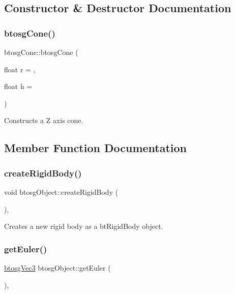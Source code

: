 \subsection{Constructor \& Destructor Documentation}
\mbox{\label{classbtosgCone_a119bf79e2311ba084939d3e25086751c}} 
\subsubsection{\texorpdfstring{btosg\+Cone()}{btosgCone()}}
{\footnotesize\ttfamily btosg\+Cone\+::btosg\+Cone (\begin{DoxyParamCaption}\item[{float}]{r = {},  }\item[{float}]{h = {} }\end{DoxyParamCaption})\hspace{0.3cm}{\ttfamily [inline]}}

Constructs a Z axis cone. 

\subsection{Member Function Documentation}
\mbox{\label{classbtosgObject_a029dbe9134fa94e7355799f67fb2cd6d}} 
\subsubsection{\texorpdfstring{create\+Rigid\+Body()}{createRigidBody()}}
{\footnotesize\ttfamily void btosg\+Object\+::create\+Rigid\+Body (\begin{DoxyParamCaption}{ }\end{DoxyParamCaption})\hspace{0.3cm}{\ttfamily [inline]}, {\ttfamily [inherited]}}

Creates a new rigid body as a bt\+Rigid\+Body object. \mbox{\label{classbtosgObject_a2019ec63bde02b72600450c7c985e77a}} 
\subsubsection{\texorpdfstring{get\+Euler()}{getEuler()}}
{\footnotesize\ttfamily \hyperlink{classbtosgVec3}{btosg\+Vec3} btosg\+Object\+::get\+Euler (\begin{DoxyParamCaption}{ }\end{DoxyParamCaption})\hspace{0.3cm}{\ttfamily [inline]}, {\ttfamily [inherited]}}

